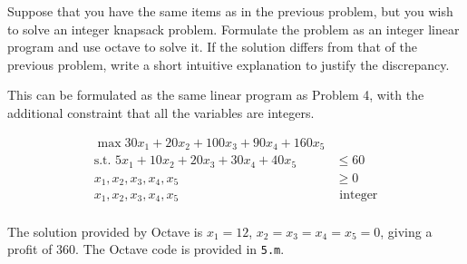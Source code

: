 \documentclass[fleqn]{homework}
\begin{document}
  \begin{problem}{5}
    \begin{question}
      Suppose that you have the same items as in the previous problem, but you
      wish to solve an integer knapsack problem.  Formulate the problem as an
      integer linear program and use octave to solve it.  If the solution
      differs from that of the previous problem, write a short intuitive
      explanation to justify the discrepancy.
    \end{question}

    This can be formulated as the same linear program as Problem 4, with the
    additional constraint that all the variables are integers.

    \begin{align*}
      \max 30x_1 + 20x_2 + 100x_3 + 90x_4 + 160 x_5 &\\
      \text{s.t. } 5x_1 + 10x_2 + 20 x_3 + 30x_4 + 40x_5 &\leq 60 \\
      x_1, x_2, x_3, x_4, x_5 &\geq 0 \\
      x_1, x_2, x_3, x_4, x_5 &\text{ integer} \\
    \end{align*}

    The solution provided by Octave is $x_1 = 12$, $x_2 = x_3 = x_4 = x_5 = 0$,
    giving a profit of 360.  The Octave code is provided in \texttt{5.m}.
  \end{problem}
\end{document}
